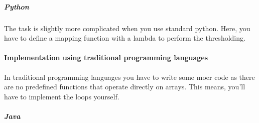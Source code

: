 \documentclass[letterpaper,10pt,english]{sphinxmanual}
\begin{document}
\subparagraph{Python}
\label{\detokenize{04-BasicSegmentation_Part2:python}}
\sphinxAtStartPar
The task is slightly more complicated when you use standard python. Here, you have to define a mapping function with a lambda to perform the thresholding.

\begin{sphinxVerbatim}[commandchars=\\\{\}]
     
\end{sphinxVerbatim}


\paragraph{Implementation using traditional programming languages}
\label{\detokenize{04-BasicSegmentation_Part2:implementation-using-traditional-programming-languages}}
\sphinxAtStartPar
In traditional programming languages you have to write some moer code as there are no predefined functions that operate directly on arrays. This means, you’ll have to implement the loops yourself.


\subparagraph{Java}
\label{\detokenize{04-BasicSegmentation_Part2:java}}
\begin{sphinxVerbatim}[commandchars=\\\{\}]
\PYG{o}{[}\PYG{o}{]}    \PYG{o}{[}\PYG{o}{]}
 
   
      
       
      \PYG{o}{[}\PYG{o}{]}\PYG{o}{[}\PYG{o}{]}
\end{sphinxVerbatim}
\end{document}
